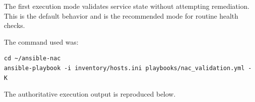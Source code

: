 \documentclass[11pt]{article}
\begin{document}
The first execution mode validates service state without attempting remediation. This is the default behavior and is the recommended mode for routine health checks.

The command used was:

\begin{verbatim}
cd ~/ansible-nac
ansible-playbook -i inventory/hosts.ini playbooks/nac_validation.yml -K
\end{verbatim}

The authoritative execution output is reproduced below.

\end{document}
